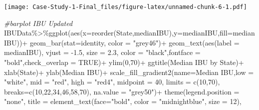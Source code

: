 \documentclass[
]{article}
\newenvironment{Shaded}{\begin{snugshade}}{\end{snugshade}}
\newcommand{\AttributeTok}[1]{\textcolor[rgb]{0.77,0.63,0.00}{#1}}
\newcommand{\CommentTok}[1]{\textcolor[rgb]{0.56,0.35,0.01}{\textit{#1}}}
\newcommand{\ConstantTok}[1]{\textcolor[rgb]{0.00,0.00,0.00}{#1}}
\newcommand{\DecValTok}[1]{\textcolor[rgb]{0.00,0.00,0.81}{#1}}
\newcommand{\FloatTok}[1]{\textcolor[rgb]{0.00,0.00,0.81}{#1}}
\newcommand{\FunctionTok}[1]{\textcolor[rgb]{0.00,0.00,0.00}{#1}}
\newcommand{\NormalTok}[1]{#1}
\newcommand{\SpecialCharTok}[1]{\textcolor[rgb]{0.00,0.00,0.00}{#1}}
\newcommand{\StringTok}[1]{\textcolor[rgb]{0.31,0.60,0.02}{#1}}
\begin{document}
\texttt{[image: Case-Study-1-Final\_files/figure-latex/unnamed-chunk-6-1.pdf]}

\begin{Shaded}
\begin{Highlighting}[]
\CommentTok{\#barplot IBU Updated}
\NormalTok{IBUData}\SpecialCharTok{\%\textgreater{}\%}\FunctionTok{ggplot}\NormalTok{(}\FunctionTok{aes}\NormalTok{(}\AttributeTok{x=}\FunctionTok{reorder}\NormalTok{(State,medianIBU),}\AttributeTok{y=}\NormalTok{medianIBU,}\AttributeTok{fill=}\NormalTok{medianIBU))}\SpecialCharTok{+}
  \FunctionTok{geom\_bar}\NormalTok{(}\AttributeTok{stat=}\StringTok{\textquotesingle{}identity\textquotesingle{}}\NormalTok{, }\AttributeTok{color =} \StringTok{"grey46"}\NormalTok{)}\SpecialCharTok{+}
  \FunctionTok{geom\_text}\NormalTok{(}\FunctionTok{aes}\NormalTok{(}\AttributeTok{label  =}\NormalTok{ medianIBU), }\AttributeTok{vjust =} \SpecialCharTok{{-}}\FloatTok{1.5}\NormalTok{, }\AttributeTok{size =} \FloatTok{2.3}\NormalTok{, }\AttributeTok{color =} \StringTok{"black"}\NormalTok{,}\AttributeTok{fontface =}  \StringTok{"bold"}\NormalTok{,}\AttributeTok{check\_overlap =} \ConstantTok{TRUE}\NormalTok{)}\SpecialCharTok{+}
  \FunctionTok{ylim}\NormalTok{(}\DecValTok{0}\NormalTok{,}\DecValTok{70}\NormalTok{)}\SpecialCharTok{+}
  \FunctionTok{ggtitle}\NormalTok{(}\StringTok{\textquotesingle{}Median IBU by State\textquotesingle{}}\NormalTok{)}\SpecialCharTok{+}
  \FunctionTok{xlab}\NormalTok{(}\StringTok{\textquotesingle{}State\textquotesingle{}}\NormalTok{)}\SpecialCharTok{+}
  \FunctionTok{ylab}\NormalTok{(}\StringTok{\textquotesingle{}Median IBU\textquotesingle{}}\NormalTok{)}\SpecialCharTok{+}
  \FunctionTok{scale\_fill\_gradient2}\NormalTok{(}\AttributeTok{name=}\StringTok{\textquotesingle{}Median IBU\textquotesingle{}}\NormalTok{,}\AttributeTok{low =} \StringTok{"white"}\NormalTok{, }\AttributeTok{mid =} \StringTok{"red"}\NormalTok{, }\AttributeTok{high =} \StringTok{"red4"}\NormalTok{, }
                       \AttributeTok{midpoint =} \DecValTok{40}\NormalTok{, }\AttributeTok{limits =} \FunctionTok{c}\NormalTok{(}\DecValTok{10}\NormalTok{,}\DecValTok{70}\NormalTok{), }
                       \AttributeTok{breaks=}\FunctionTok{c}\NormalTok{(}\DecValTok{10}\NormalTok{,}\DecValTok{22}\NormalTok{,}\DecValTok{34}\NormalTok{,}\DecValTok{46}\NormalTok{,}\DecValTok{58}\NormalTok{,}\DecValTok{70}\NormalTok{), }\AttributeTok{na.value =} \StringTok{"grey50"}\NormalTok{)}\SpecialCharTok{+}
  \FunctionTok{theme}\NormalTok{(}\AttributeTok{legend.position =} \StringTok{"none"}\NormalTok{,}
        \AttributeTok{title =} \FunctionTok{element\_text}\NormalTok{(}\AttributeTok{face=}\StringTok{"bold"}\NormalTok{, }\AttributeTok{color =} \StringTok{"midnightblue"}\NormalTok{, }\AttributeTok{size =} \DecValTok{12}\NormalTok{),}

\end{Highlighting}
\end{Shaded}
\end{document}
